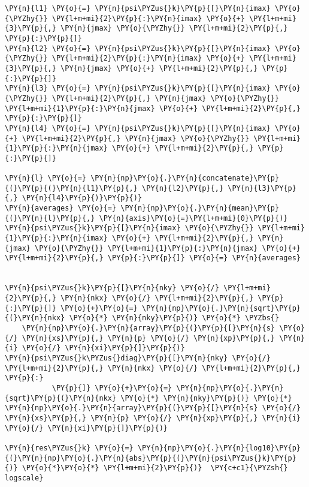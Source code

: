 \begin{Verbatim}[commandchars=\\\{\}]
\PY{n}{l1} \PY{o}{=} \PY{n}{psi\PYZus{}k}\PY{p}{[}\PY{n}{imax} \PY{o}{\PYZhy{}} \PY{l+m+mi}{2}\PY{p}{:}\PY{n}{imax} \PY{o}{+} \PY{l+m+mi}{3}\PY{p}{,} \PY{n}{jmax} \PY{o}{\PYZhy{}} \PY{l+m+mi}{2}\PY{p}{,} \PY{p}{:}\PY{p}{]}
\PY{n}{l2} \PY{o}{=} \PY{n}{psi\PYZus{}k}\PY{p}{[}\PY{n}{imax} \PY{o}{\PYZhy{}} \PY{l+m+mi}{2}\PY{p}{:}\PY{n}{imax} \PY{o}{+} \PY{l+m+mi}{3}\PY{p}{,} \PY{n}{jmax} \PY{o}{+} \PY{l+m+mi}{2}\PY{p}{,} \PY{p}{:}\PY{p}{]}
\PY{n}{l3} \PY{o}{=} \PY{n}{psi\PYZus{}k}\PY{p}{[}\PY{n}{imax} \PY{o}{\PYZhy{}} \PY{l+m+mi}{2}\PY{p}{,} \PY{n}{jmax} \PY{o}{\PYZhy{}} \PY{l+m+mi}{1}\PY{p}{:}\PY{n}{jmax} \PY{o}{+} \PY{l+m+mi}{2}\PY{p}{,} \PY{p}{:}\PY{p}{]}
\PY{n}{l4} \PY{o}{=} \PY{n}{psi\PYZus{}k}\PY{p}{[}\PY{n}{imax} \PY{o}{+} \PY{l+m+mi}{2}\PY{p}{,} \PY{n}{jmax} \PY{o}{\PYZhy{}} \PY{l+m+mi}{1}\PY{p}{:}\PY{n}{jmax} \PY{o}{+} \PY{l+m+mi}{2}\PY{p}{,} \PY{p}{:}\PY{p}{]}

\PY{n}{l} \PY{o}{=} \PY{n}{np}\PY{o}{.}\PY{n}{concatenate}\PY{p}{(}\PY{p}{(}\PY{n}{l1}\PY{p}{,} \PY{n}{l2}\PY{p}{,} \PY{n}{l3}\PY{p}{,} \PY{n}{l4}\PY{p}{)}\PY{p}{)}
\PY{n}{averages} \PY{o}{=} \PY{n}{np}\PY{o}{.}\PY{n}{mean}\PY{p}{(}\PY{n}{l}\PY{p}{,} \PY{n}{axis}\PY{o}{=}\PY{l+m+mi}{0}\PY{p}{)}
\PY{n}{psi\PYZus{}k}\PY{p}{[}\PY{n}{imax} \PY{o}{\PYZhy{}} \PY{l+m+mi}{1}\PY{p}{:}\PY{n}{imax} \PY{o}{+} \PY{l+m+mi}{2}\PY{p}{,} \PY{n}{jmax} \PY{o}{\PYZhy{}} \PY{l+m+mi}{1}\PY{p}{:}\PY{n}{jmax} \PY{o}{+} \PY{l+m+mi}{2}\PY{p}{,} \PY{p}{:}\PY{p}{]} \PY{o}{=} \PY{n}{averages}


\PY{n}{psi\PYZus{}k}\PY{p}{[}\PY{n}{nky} \PY{o}{/} \PY{l+m+mi}{2}\PY{p}{,} \PY{n}{nkx} \PY{o}{/} \PY{l+m+mi}{2}\PY{p}{,} \PY{p}{:}\PY{p}{]} \PY{o}{+}\PY{o}{=} \PY{n}{np}\PY{o}{.}\PY{n}{sqrt}\PY{p}{(}\PY{n}{nkx} \PY{o}{*} \PY{n}{nky}\PY{p}{)} \PY{o}{*} \PYZbs{}
    \PY{n}{np}\PY{o}{.}\PY{n}{array}\PY{p}{(}\PY{p}{[}\PY{n}{s} \PY{o}{/} \PY{n}{xs}\PY{p}{,} \PY{n}{p} \PY{o}{/} \PY{n}{xp}\PY{p}{,} \PY{n}{i} \PY{o}{/} \PY{n}{xi}\PY{p}{]}\PY{p}{)}
\PY{n}{psi\PYZus{}k\PYZus{}diag}\PY{p}{[}\PY{n}{nky} \PY{o}{/} \PY{l+m+mi}{2}\PY{p}{,} \PY{n}{nkx} \PY{o}{/} \PY{l+m+mi}{2}\PY{p}{,} \PY{p}{:}
           \PY{p}{]} \PY{o}{+}\PY{o}{=} \PY{n}{np}\PY{o}{.}\PY{n}{sqrt}\PY{p}{(}\PY{n}{nkx} \PY{o}{*} \PY{n}{nky}\PY{p}{)} \PY{o}{*} \PY{n}{np}\PY{o}{.}\PY{n}{array}\PY{p}{(}\PY{p}{[}\PY{n}{s} \PY{o}{/} \PY{n}{xs}\PY{p}{,} \PY{n}{p} \PY{o}{/} \PY{n}{xp}\PY{p}{,} \PY{n}{i} \PY{o}{/} \PY{n}{xi}\PY{p}{]}\PY{p}{)}

\PY{n}{res\PYZus{}k} \PY{o}{=} \PY{n}{np}\PY{o}{.}\PY{n}{log10}\PY{p}{(}\PY{n}{np}\PY{o}{.}\PY{n}{abs}\PY{p}{(}\PY{n}{psi\PYZus{}k}\PY{p}{)} \PY{o}{*}\PY{o}{*} \PY{l+m+mi}{2}\PY{p}{)}  \PY{c+c1}{\PYZsh{} logscale}


\end{Verbatim}
